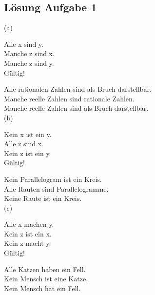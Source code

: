 \documentclass[a4paper, margins=3cm]{homework}
\begin{document}
\subsection*{Lösung Aufgabe 1} 
	(a) \\
	\begin{center}
		Alle x sind y. \\
		Manche z sind x. \\
		Manche z sind y. \\
		Gültig!
	\end{center}
	Alle rationalen Zahlen sind als Bruch darstellbar. \\
	Manche reelle Zahlen sind rationale Zahlen. \\
	Manche reelle Zahlen sind als Bruch darstellbar. \\
	(b) \\
	\begin{center}
		Kein x ist ein y. \\
		Alle z sind x. \\
		Kein z ist ein y. \\
		Gültig!
	\end{center}
	Kein Parallelogram ist ein Kreis. \\
	Alle Rauten sind Parallelogramme. \\
	Keine Raute ist ein Kreis. \\
	(c) \\
	\begin{center}
		Alle x machen y. \\
		Kein z ist ein x. \\
		Kein z macht y. \\
		Gültig!
	\end{center}
	Alle Katzen haben ein Fell. \\
	Kein Mensch ist eine Katze. \\
	Kein Mensch hat ein Fell.
\end{document}
